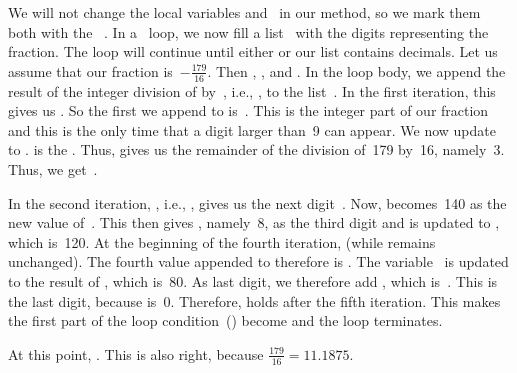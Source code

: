 We will not change the local variables  and~ in our method, so we mark them both with the ~.%
%
%
%
In a ~loop, we now fill a list~ with the digits representing the fraction.
The loop will continue until either  or our list  contains  decimals.
Let us assume that our fraction is~$-\frac{179}{16}$.
Then , , and .
In the loop body, we append the result of the integer division of  by~, i.e., , to the list~.
In the first iteration, this gives us .
So the first  we append to  is~.
This is the integer part of our fraction and this is the only time that a digit larger than~9 can appear.
We now update  to .
\pythonilIdx{\%} is the .
Thus,  gives us the remainder of the division of~179 by~16, namely~3.
Thus, we get~.

In the second iteration, , i.e., , gives us the next digit~.
Now,  becomes~140 as the new value of~.
This then gives , namely~8, as the third digit and  is updated to , which is~120.
At the beginning of the fourth iteration,  (while  remains unchanged).
The fourth value appended to  therefore is .
The variable~ is updated to the result of , which is~80.
As last digit, we therefore add , which is~.
This is the last digit, because  is~0.
Therefore,  holds after the fifth iteration.
This makes the first part of the loop condition~() become  and the loop terminates.

At this point, .
This is also right, because $\frac{179}{16}=11.1875$.


